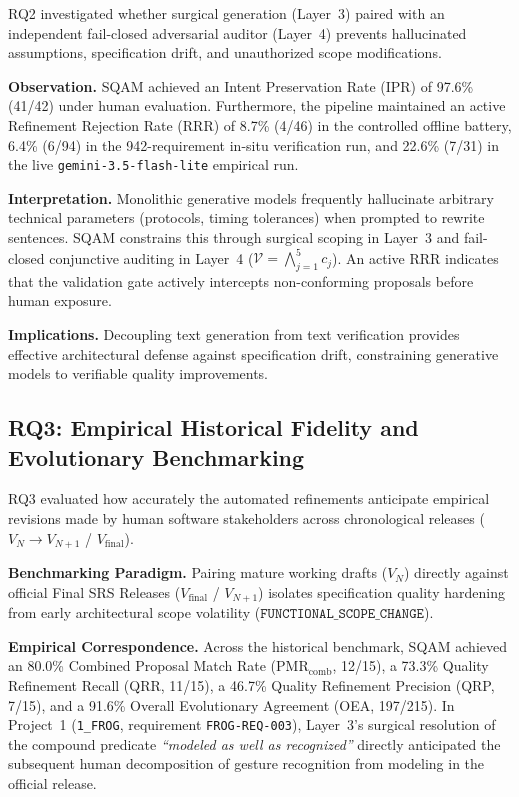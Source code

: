 \documentclass[journal]{IEEEtran}
\begin{document}
RQ2 investigated whether surgical generation (Layer~3) paired with an independent fail-closed adversarial auditor (Layer~4) prevents hallucinated assumptions, specification drift, and unauthorized scope modifications.

\textbf{Observation.} SQAM achieved an Intent Preservation Rate (IPR) of 97.6\% (41/42) under human evaluation. Furthermore, the pipeline maintained an active Refinement Rejection Rate (RRR) of 8.7\% (4/46) in the controlled offline battery, 6.4\% (6/94) in the 942-requirement in-situ verification run, and 22.6\% (7/31) in the live \texttt{gemini-3.5-flash-lite} empirical run.

\textbf{Interpretation.} Monolithic generative models frequently hallucinate arbitrary technical parameters (protocols, timing tolerances) when prompted to rewrite sentences. SQAM constrains this through surgical scoping in Layer~3 and fail-closed conjunctive auditing in Layer~4 ($\mathcal{V} = \bigwedge_{j=1}^5 c_j$). An active RRR indicates that the validation gate actively intercepts non-conforming proposals before human exposure.

\textbf{Implications.} Decoupling text generation from text verification provides effective architectural defense against specification drift, constraining generative models to verifiable quality improvements.

\subsection{RQ3: Empirical Historical Fidelity and Evolutionary Benchmarking}
\label{sec:discussion-rq3}

RQ3 evaluated how accurately the automated refinements anticipate empirical revisions made by human software stakeholders across chronological releases ($V_N \to V_{N+1}$ / $V_{\text{final}}$).

\textbf{Benchmarking Paradigm.} Pairing mature working drafts ($V_N$) directly against official Final SRS Releases ($V_{\text{final}}$ / $V_{N+1}$) isolates specification quality hardening from early architectural scope volatility ($\texttt{FUNCTIONAL\_SCOPE\_CHANGE}$).

\textbf{Empirical Correspondence.} Across the historical benchmark, SQAM achieved an 80.0\% Combined Proposal Match Rate ($\text{PMR}_{\text{comb}}$, 12/15), a 73.3\% Quality Refinement Recall (QRR, 11/15), a 46.7\% Quality Refinement Precision (QRP, 7/15), and a 91.6\% Overall Evolutionary Agreement (OEA, 197/215). In Project~1 (\texttt{1\_FROG}, requirement \texttt{FROG-REQ-003}), Layer~3's surgical resolution of the compound predicate \textit{``modeled as well as recognized''} directly anticipated the subsequent human decomposition of gesture recognition from modeling in the official release.
\end{document}
